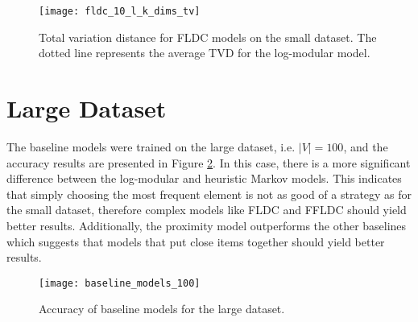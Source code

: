 \begin{figure}
  \centering
  \texttt{[image: fldc\_10\_l\_k\_dims\_tv]}
  \caption{Total variation distance for FLDC models on the small dataset. The dotted line represents the average TVD for the log-modular model.}
  \label{fig:small_tv_comparison}
\end{figure}

\section{Large Dataset}

The baseline models were trained on the large dataset, i.e. $|V| = 100$, and the accuracy results are presented in Figure \ref{fig:large_baselines}. In this case, there is a more significant difference between the log-modular and heuristic Markov models. This indicates that simply choosing the most frequent element is not as good of a strategy as for the small dataset, therefore complex models like FLDC and FFLDC should yield better results. Additionally, the proximity model outperforms the other baselines which suggests that models that put close items together should yield better results.

\begin{figure}
  \centering
  \texttt{[image: baseline\_models\_100]}
  \caption{Accuracy of baseline models for the large dataset.}
  \label{fig:large_baselines}
\end{figure}
